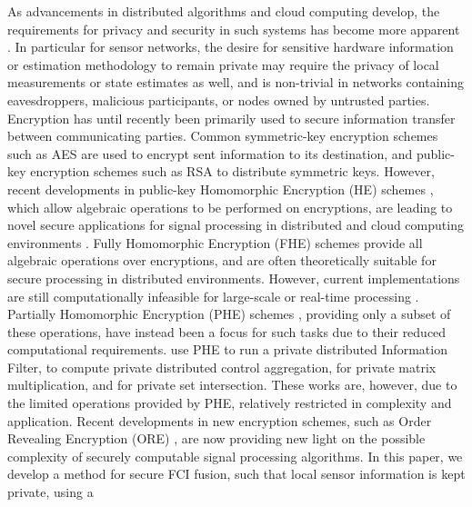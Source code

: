 \documentclass[letterpaper, 10 pt, conference]{ieeeconf}  %
\begin{document}
As advancements in distributed algorithms and cloud computing develop, the requirements for privacy and security in such systems has become more apparent \cite{renSecurityChallengesPublic2012,brennerSecretProgramExecution2011}. In particular for sensor networks, the desire for sensitive hardware information or estimation methodology to remain private may require the privacy of local measurements or state estimates as well, and is non-trivial in networks containing eavesdroppers, malicious participants, or nodes owned by untrusted parties. Encryption has until recently been primarily used to secure information transfer between communicating parties. Common symmetric-key encryption schemes such as AES \cite{daemonAnnouncingAdvancedEncryption2001} are used to encrypt sent information to its destination, and public-key encryption schemes such as RSA \cite{rivestMethodObtainingDigital1978} to distribute symmetric keys. However, recent developments in public-key Homomorphic Encryption (HE) schemes \cite{gentryFullyHomomorphicEncryption2009,vandijkFullyHomomorphicEncryption2010a,stehleFasterFullyHomomorphic2010,elgamalPublicKeyCryptosystem1985,paillierPublicKeyCryptosystemsBased1999}, which allow algebraic operations to be performed on encryptions, are leading to novel secure applications for signal processing in distributed and cloud computing environments \cite{lagendijkEncryptedSignalProcessing2013,aristovEncryptedMultisensorInformation2018,farokhiSecurePrivateControl2017,alexandruEncryptedCooperativeControla,kogisoCyberSecurityEnhancementNetworked2015,kerschbaumOutsourcedPrivateSet2012}. Fully Homomorphic Encryption (FHE) schemes \cite{gentryFullyHomomorphicEncryption2009,vandijkFullyHomomorphicEncryption2010a,stehleFasterFullyHomomorphic2010} provide all algebraic operations over encryptions, and are often theoretically suitable for secure processing in distributed environments. However, current implementations are still computationally infeasible for large-scale or real-time processing \cite{duImplementingMLAlgorithms2017,acarSurveyHomomorphicEncryption2018}. Partially Homomorphic Encryption (PHE) schemes \cite{elgamalPublicKeyCryptosystem1985,paillierPublicKeyCryptosystemsBased1999}, providing only a subset of these operations, have instead been a focus for such tasks due to their reduced computational requirements. \cite{aristovEncryptedMultisensorInformation2018} use PHE to run a private distributed Information Filter, \cite{alexandruEncryptedCooperativeControla,farokhiSecurePrivateControl2017} to compute private distributed control aggregation, \cite{kogisoCyberSecurityEnhancementNetworked2015} for private matrix multiplication, and \cite{kerschbaumOutsourcedPrivateSet2012} for private set intersection. These works are, however, due to the limited operations provided by PHE, relatively restricted in complexity and application. Recent developments in new encryption schemes, such as Order Revealing Encryption (ORE) \cite{chenettePracticalOrderRevealingEncryption2016,lewiOrderRevealingEncryptionNew2016,bogatovComparativeEvaluationOrderPreserving}, are now providing new light on the possible complexity of securely computable signal processing algorithms. In this paper, we develop a method for secure FCI fusion, such that local sensor information is kept private, using a 
\end{document}
